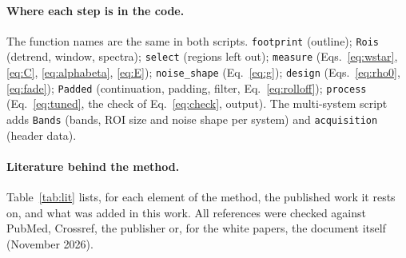 \documentclass[11pt,a4paper]{article}
\newcommand{\code}[1]{\texttt{#1}}
\begin{document}
\paragraph{Where each step is in the code.} The function names are the same in both scripts.
\code{footprint} (outline); \code{Rois} (detrend, window, spectra); \code{select} (regions left out);
\code{measure} (Eqs.~\ref{eq:wstar}, \ref{eq:C}, \ref{eq:alphabeta}, \ref{eq:E}); \code{noise\_shape}
(Eq.~\ref{eq:g}); \code{design} (Eqs.~\ref{eq:rho0}, \ref{eq:fade}); \code{Padded} (continuation, padding, filter,
Eq.~\ref{eq:rolloff}); \code{process} (Eq.~\ref{eq:tuned}, the check of Eq.~\ref{eq:check}, output). The
multi-system script adds \code{Bands} (bands, ROI size and noise shape per system) and \code{acquisition} (header
data).


\paragraph{Literature behind the method.} Table~\ref{tab:lit} lists, for each element of the method, the published
work it rests on, and what was added in this work. All references were checked against PubMed, Crossref, the
publisher or, for the white papers, the document itself (November 2026).
\end{document}
